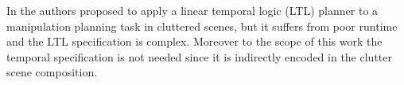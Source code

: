 

In \citep{he.lahijanian2015towards-manipulation-planning} %
the authors proposed to apply a linear temporal logic (LTL) planner to a manipulation planning task in cluttered scenes, but it suffers from poor runtime and the LTL specification is complex. Moreover to the scope of this work the temporal specification is not needed since it is indirectly encoded in the clutter scene composition. 



